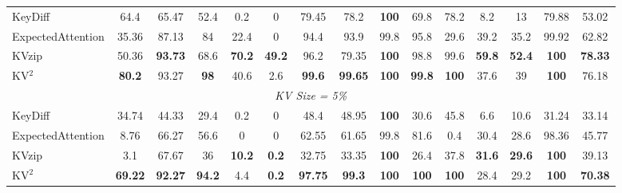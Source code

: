 \documentclass[11pt]{article}
\begin{document}
\begin{table}[htbp]
\begin{tabular}{l|cc|cccccccc|cc|c|c}
KeyDiff
    & 64.4 & 65.47
    & 52.4 & 0.2 & 0
    & 79.45 & 78.2
    & \textbf{100} & 69.8 & 78.2
    & 8.2 & 13
    & 79.88
    & 53.02 \\

ExpectedAttention
    & 35.36 & 87.13
    & 84 & 22.4 & 0
    & 94.4 & 93.9
    & 99.8 & 95.8 & 29.6
    & 39.2 & 35.2
    & 99.92
    & 62.82 \\

KVzip
    & 50.36 & \textbf{93.73}
    & 68.6 & \textbf{70.2} & \textbf{49.2}
    & 96.2 & 79.35
    & \textbf{100} & 98.8 & 99.6
    & \textbf{59.8} & \textbf{52.4}
    & \textbf{100}
    & \textbf{78.33} \\

KV$^2$
    & \textbf{80.2} & 93.27
    & \textbf{98} & 40.6 & 2.6
    & \textbf{99.6} & \textbf{99.65}
    & \textbf{100} & \textbf{99.8} & \textbf{100}
    & 37.6 & 39
    & \textbf{100}
    & 76.18 \\

\midrule
\multicolumn{15}{c}{\textit{KV Size = 5\%}} \\
\midrule

KeyDiff
    & 34.74 & 44.33
    & 29.4 & 0.2 & 0
    & 48.4 & 48.95
    & \textbf{100} & 30.6 & 45.8
    & 6.6 & 10.6
    & 31.24
    & 33.14 \\

ExpectedAttention
    & 8.76 & 66.27
    & 56.6 & 0 & 0
    & 62.55 & 61.65
    & 99.8 & 81.6 & 0.4
    & 30.4 & 28.6
    & 98.36
    & 45.77 \\

KVzip
    & 3.1 & 67.67
    & 36 & \textbf{10.2} & \textbf{0.2}
    & 32.75 & 33.35
    & \textbf{100} & 26.4 & 37.8
    & \textbf{31.6} & \textbf{29.6}
    & \textbf{100}
    & 39.13 \\

KV$^2$
    & \textbf{69.22} & \textbf{92.27}
    & \textbf{94.2} & 4.4 & \textbf{0.2}
    & \textbf{97.75} & \textbf{99.3}
    & \textbf{100} & \textbf{100} & \textbf{100}
    & 28.4 & 29.2
    & \textbf{100}
    & \textbf{70.38} \\

\bottomrule
\end{tabular}
\end{table}

\clearpage
\end{document}
